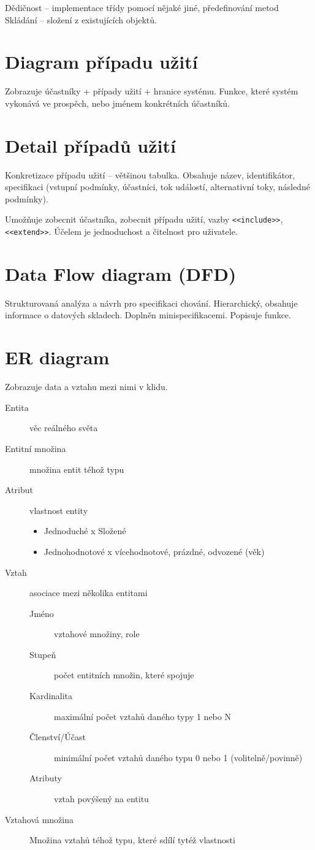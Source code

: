 \documentclass[a4paper, 11pt]{report}
\begin{document}
Dědičnost -- implementace třídy pomocí nějaké jiné, předefinování metod\\
Skládání -- složení z existujících objektů.

\section{Diagram případu užití}
Zobrazuje účastníky + případy užití + hranice systému. Funkce, které systém vykonává ve prospěch, nebo jménem konkrétních účastníků.

\section{Detail případů užití}
Konkretizace případu užití -- většinou tabulka. Obsahuje název, identifikátor, specifikaci (vstupní podmínky, účastníci, tok událostí, alternativní toky, následné podmínky).

Umožňuje zobecnit účastníka, zobecnit případu užití, vazby \verb|<<include>>|, \verb|<<extend>>|. Účelem je jednoduchost a čitelnost pro uživatele.

\section{Data Flow diagram (DFD)}
Strukturovaná analýza a návrh pro specifikaci chování. Hierarchický, obsahuje informace o datových skladech. Doplněn minispecifikacemi. Popisuje funkce.

\section{ER diagram}
Zobrazuje data a vztahu mezi nimi v klidu.

\begin{description}
	\item[Entita] věc reálného světa
	\item[Entitní množina] množina entit téhož typu
	\item[Atribut] vlastnost entity
	\begin{itemize}
		\item Jednoduché x Složené
		\item Jednohodnotové x vícehodnotové, prázdné, odvozené (věk)
	\end{itemize}
	\item[Vztah] asociace mezi několika entitami
	\begin{description}
		\item[Jméno] vztahové množiny, role
		\item[Stupeň] počet entitních množin, které spojuje
		\item[Kardinalita] maximální počet vztahů daného typy 1 nebo N
		\item[Členství/Účast] minimální počet vztahů daného typu 0 nebo 1 (volitelně/povinně)
		\item[Atributy] vztah povýšený na entitu
	\end{description}
	\item[Vztahová množina] Množina vztahů téhož typu, které sdílí tytéž vlastnosti
\end{description}
\end{document}
